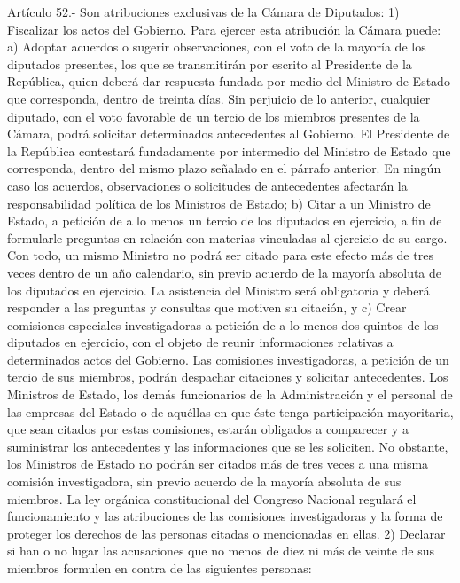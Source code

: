     Artículo 52.- Son atribuciones exclusivas de la Cámara de Diputados:
    1) Fiscalizar los actos del Gobierno. Para ejercer esta atribución la Cámara puede:
    a) Adoptar acuerdos o sugerir observaciones, con el voto de la mayoría de los diputados presentes, los que se transmitirán por escrito al Presidente de la República, quien deberá dar respuesta fundada por medio del Ministro de Estado que corresponda, dentro de treinta días.
    Sin perjuicio de lo anterior, cualquier diputado, con el voto favorable de un tercio de los miembros presentes de la Cámara, podrá solicitar determinados antecedentes al Gobierno. El Presidente de la República contestará fundadamente por intermedio del Ministro de Estado que corresponda, dentro del mismo plazo señalado en el párrafo anterior.
    En ningún caso los acuerdos, observaciones o solicitudes de antecedentes afectarán la responsabilidad política de los Ministros de Estado;
    b) Citar a un Ministro de Estado, a petición de a lo menos un tercio de los diputados en ejercicio, a fin de formularle preguntas en relación con materias vinculadas al ejercicio de su cargo. Con todo, un mismo Ministro no podrá ser citado para este efecto más de tres veces dentro de un año calendario, sin previo acuerdo de la mayoría absoluta de los diputados en ejercicio.
    La asistencia del Ministro será obligatoria y deberá responder a las preguntas y consultas que motiven su citación, y
    c) Crear comisiones especiales investigadoras a petición de a lo menos dos quintos de los diputados en ejercicio, con el objeto de reunir informaciones relativas a determinados actos del Gobierno.
    Las comisiones investigadoras, a petición de un tercio de sus miembros, podrán despachar citaciones y solicitar antecedentes. Los Ministros de Estado, los demás funcionarios de la Administración y el personal de las empresas del Estado o de aquéllas en que éste tenga participación mayoritaria, que sean citados por estas comisiones, estarán obligados a comparecer y a suministrar los antecedentes y las informaciones que se les soliciten.
    No obstante, los Ministros de Estado no podrán ser citados más de tres veces a una misma comisión investigadora, sin previo acuerdo de la mayoría absoluta de sus miembros.
    La ley orgánica constitucional del Congreso Nacional regulará el funcionamiento y las atribuciones de las comisiones investigadoras y la forma de proteger los derechos de las personas citadas o mencionadas en ellas.
    2) Declarar si han o no lugar las acusaciones que no menos de diez ni más de veinte de sus miembros formulen en contra de las siguientes personas:
